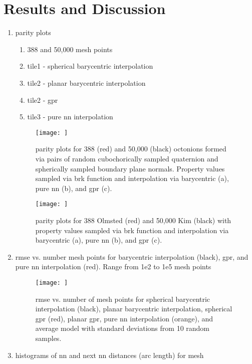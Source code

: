 \documentclass[preprint,12pt]{elsarticle}
\begin{document}
\section{Results and Discussion}
\begin{enumerate}
    \item parity plots
    \begin{enumerate}
        \item 388 and 50,000 mesh points
        \item tile1 - spherical barycentric interpolation
        \item tile2 - planar barycentric interpolation
        \item tile2 - \gls{gpr}
        \item tile3 - pure \gls{nn} interpolation
    \end{enumerate}
    \begin{figure}
        \centering
        \texttt{[image: ]}
        \caption{parity plots for 388 (red) and 50,000 (black) octonions formed via pairs of random cubochorically sampled quaternion and spherically sampled boundary plane normals. Property values sampled via \acrlong{brk} function and interpolation via barycentric (a), pure \acrlong{nn} (b), and \acrlong{gpr} (c).}
        \label{fig:brk-parity1}
    \end{figure}
    \begin{figure}
        \centering
        \texttt{[image: ]}
        \caption{parity plots for 388 Olmsted  (red) and 50,000 Kim  (black) with property values sampled via \acrlong{brk} function and interpolation via barycentric (a), pure \acrlong{nn} (b), and \acrlong{gpr} (c).}
        \label{fig:brk-parity2}
    \end{figure}
    \item \Gls{rmse} vs. number mesh points for barycentric interpolation (black), \gls{gpr}, and pure \gls{nn} interpolation (red). Range from 1e2 to 1e5 mesh points
    \begin{figure}
        \centering
        \texttt{[image: ]}
        \caption{\acrlong{rmse} vs. number of mesh points for spherical barycentric interpolation (black), planar barycentric interpolation, spherical \acrlong{gpr} (red), planar \gls{gpr}, pure \acrlong{nn} interpolation (orange), and average model with standard deviations from 10 random samples.}
        \label{fig:brk-rmse}
    \end{figure}
    \item histograms of \gls{nn} and next \gls{nn} distances (arc length) for mesh

\end{enumerate}
\end{document}
